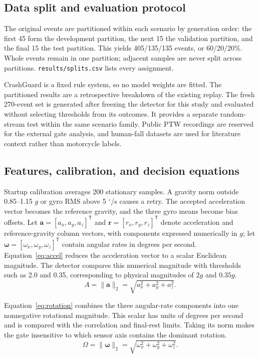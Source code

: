 \documentclass[10pt,a4paper]{article}
\newcommand{\degree}{\ensuremath{^{\circ}}}
\begin{document}
\subsection{Data split and evaluation protocol}
The original events are partitioned within each scenario by generation order: the first 45 form the development partition, the next 15 the validation partition, and the final 15 the test partition. This yields 405/135/135 events, or 60/20/20\%. Whole events remain in one partition; adjacent samples are never split across partitions. \texttt{results/splits.csv} lists every assignment.

CrashGuard is a fixed rule system, so no model weights are fitted. The partitioned results are a retrospective breakdown of the existing replay. The fresh 270-event set is generated after freezing the detector for this study and evaluated without selecting thresholds from its outcomes. It provides a separate random-stream test within the same scenario family. Public PTW recordings are reserved for the external gate analysis, and human-fall datasets are used for literature context rather than motorcycle labels.

\subsection{Features, calibration, and decision equations}
Startup calibration averages 200 stationary samples. A gravity norm outside 0.85--1.15 $g$ or gyro RMS above 5 $\degree$/s causes a retry. The accepted acceleration vector becomes the reference gravity, and the three gyro means become bias offsets. Let $\mathbf a=[a_x,a_y,a_z]^{\mathsf T}$ and $\mathbf r=[r_x,r_y,r_z]^{\mathsf T}$ denote acceleration and reference-gravity column vectors, with components expressed numerically in $g$; let $\boldsymbol\omega=[\omega_x,\omega_y,\omega_z]^{\mathsf T}$ contain angular rates in degrees per second. Equation~\eqref{eq:accel} reduces the acceleration vector to a scalar Euclidean magnitude. The detector compares this numerical magnitude with thresholds such as 2.0 and 0.35, corresponding to physical magnitudes of $2g$ and $0.35g$.
\begin{equation}\label{eq:accel}
A=\|\mathbf a\|_2=\sqrt{a_x^2+a_y^2+a_z^2}.
\end{equation}

Equation~\eqref{eq:rotation} combines the three angular-rate components into one nonnegative rotational magnitude. This scalar has units of degrees per second and is compared with the correlation and final-rest limits. Taking its norm makes the gate insensitive to which sensor axis contains the dominant rotation.
\begin{equation}\label{eq:rotation}
\Omega=\|\boldsymbol\omega\|_2=\sqrt{\omega_x^2+\omega_y^2+\omega_z^2}.
\end{equation}
\end{document}
